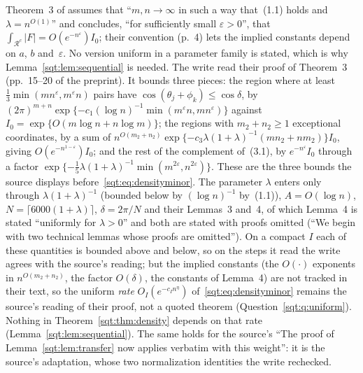 \begin{remark}\label{sqt:rem:uniformity}
Theorem~3 of \cite{CM} assumes that ``$m,n\to\infty$ in such a way that~(1.1)
holds and $\lambda=n^{O(1)}$'' and concludes, ``for sufficiently small
$\varepsilon>0$'', that $\int_{\mathcal R^c}|F|=O(e^{-n^\varepsilon})I_0$;
their convention (p.~4) lets the implied constants depend on $a$, $b$
and~$\varepsilon$. No version uniform in a parameter family is stated, which
is why Lemma~\ref{sqt:lem:sequential} is needed. The write read their proof
of Theorem~3 (pp.~15--20 of the preprint). It bounds three pieces: the
region where at least $\tfrac13\min(mn^\varepsilon,m^\varepsilon n)$ pairs
have $\cos(\theta_j+\phi_k)\le\cos\delta$, by
$(2\pi)^{m+n}\exp\{-c_1(\log n)^{-1}\min(m^\varepsilon n,mn^\varepsilon)\}$
against $I_0=\exp\{O(m\log n+n\log m)\}$; the regions with $m_2+n_2\ge1$
exceptional coordinates, by a sum of
$n^{O(m_2+n_2)}\exp\{-c_3\lambda(1+\lambda)^{-1}(mn_2+nm_2)\}I_0$, giving
$O(e^{-n^{1-\varepsilon}})I_0$; and the rest of the complement of~(3.1), by
$e^{-n^\varepsilon}I_0$ through a factor
$\exp\{-\tfrac15\lambda(1+\lambda)^{-1}\min(m^{2\varepsilon},n^{2\varepsilon})\}$.
These are the three bounds the source displays before~\eqref{sqt:eq:densityminor}.
The parameter $\lambda$ enters only through $\lambda(1+\lambda)^{-1}$
(bounded below by $(\log n)^{-1}$ by~(1.1)), $A=O(\log n)$,
$N=\lceil6000(1+\lambda)\rceil$, $\delta=2\pi/N$ and their Lemmas~3 and~4,
of which Lemma~4 is stated ``uniformly for $\lambda>0$'' and both are stated
with proofs omitted (``We begin with two technical lemmas whose proofs are
omitted''). On a compact $I$ each of these quantities is bounded above and
below, so on the steps it read the write agrees with the source's reading;
but the implied constants (the $O(\cdot)$ exponents in
$n^{O(m_2+n_2)}$, the factor $O(\delta)$, the constants of Lemma~4) are not
tracked in their text, so the uniform \emph{rate}
$O_I(e^{-c_In^\eta})$ of~\eqref{sqt:eq:densityminor} remains the source's
reading of their proof, not a quoted theorem
(Question~\ref{sqt:q:uniform}). Nothing in Theorem~\ref{sqt:thm:density}
depends on that rate (Lemma~\ref{sqt:lem:sequential}). The same holds for
the source's ``The proof of Lemma~\ref{sqt:lem:transfer} now applies
verbatim with this weight'': it is the source's adaptation, whose two
normalization identities the write rechecked.
\end{remark}

